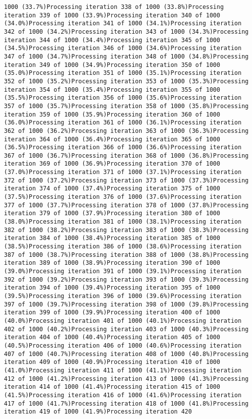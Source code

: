 \documentclass[
]{article}
\begin{document}
\begin{verbatim}
1000 (33.7%)Processing iteration 338 of 1000 (33.8%)Processing iteration 339 of 1000 (33.9%)Processing iteration 340 of 1000 (34.0%)Processing iteration 341 of 1000 (34.1%)Processing iteration 342 of 1000 (34.2%)Processing iteration 343 of 1000 (34.3%)Processing iteration 344 of 1000 (34.4%)Processing iteration 345 of 1000 (34.5%)Processing iteration 346 of 1000 (34.6%)Processing iteration 347 of 1000 (34.7%)Processing iteration 348 of 1000 (34.8%)Processing iteration 349 of 1000 (34.9%)Processing iteration 350 of 1000 (35.0%)Processing iteration 351 of 1000 (35.1%)Processing iteration 352 of 1000 (35.2%)Processing iteration 353 of 1000 (35.3%)Processing iteration 354 of 1000 (35.4%)Processing iteration 355 of 1000 (35.5%)Processing iteration 356 of 1000 (35.6%)Processing iteration 357 of 1000 (35.7%)Processing iteration 358 of 1000 (35.8%)Processing iteration 359 of 1000 (35.9%)Processing iteration 360 of 1000 (36.0%)Processing iteration 361 of 1000 (36.1%)Processing iteration 362 of 1000 (36.2%)Processing iteration 363 of 1000 (36.3%)Processing iteration 364 of 1000 (36.4%)Processing iteration 365 of 1000 (36.5%)Processing iteration 366 of 1000 (36.6%)Processing iteration 367 of 1000 (36.7%)Processing iteration 368 of 1000 (36.8%)Processing iteration 369 of 1000 (36.9%)Processing iteration 370 of 1000 (37.0%)Processing iteration 371 of 1000 (37.1%)Processing iteration 372 of 1000 (37.2%)Processing iteration 373 of 1000 (37.3%)Processing iteration 374 of 1000 (37.4%)Processing iteration 375 of 1000 (37.5%)Processing iteration 376 of 1000 (37.6%)Processing iteration 377 of 1000 (37.7%)Processing iteration 378 of 1000 (37.8%)Processing iteration 379 of 1000 (37.9%)Processing iteration 380 of 1000 (38.0%)Processing iteration 381 of 1000 (38.1%)Processing iteration 382 of 1000 (38.2%)Processing iteration 383 of 1000 (38.3%)Processing iteration 384 of 1000 (38.4%)Processing iteration 385 of 1000 (38.5%)Processing iteration 386 of 1000 (38.6%)Processing iteration 387 of 1000 (38.7%)Processing iteration 388 of 1000 (38.8%)Processing iteration 389 of 1000 (38.9%)Processing iteration 390 of 1000 (39.0%)Processing iteration 391 of 1000 (39.1%)Processing iteration 392 of 1000 (39.2%)Processing iteration 393 of 1000 (39.3%)Processing iteration 394 of 1000 (39.4%)Processing iteration 395 of 1000 (39.5%)Processing iteration 396 of 1000 (39.6%)Processing iteration 397 of 1000 (39.7%)Processing iteration 398 of 1000 (39.8%)Processing iteration 399 of 1000 (39.9%)Processing iteration 400 of 1000 (40.0%)Processing iteration 401 of 1000 (40.1%)Processing iteration 402 of 1000 (40.2%)Processing iteration 403 of 1000 (40.3%)Processing iteration 404 of 1000 (40.4%)Processing iteration 405 of 1000 (40.5%)Processing iteration 406 of 1000 (40.6%)Processing iteration 407 of 1000 (40.7%)Processing iteration 408 of 1000 (40.8%)Processing iteration 409 of 1000 (40.9%)Processing iteration 410 of 1000 (41.0%)Processing iteration 411 of 1000 (41.1%)Processing iteration 412 of 1000 (41.2%)Processing iteration 413 of 1000 (41.3%)Processing iteration 414 of 1000 (41.4%)Processing iteration 415 of 1000 (41.5%)Processing iteration 416 of 1000 (41.6%)Processing iteration 417 of 1000 (41.7%)Processing iteration 418 of 1000 (41.8%)Processing iteration 419 of 1000 (41.9%)Processing iteration 420 
\end{verbatim}
\end{document}
